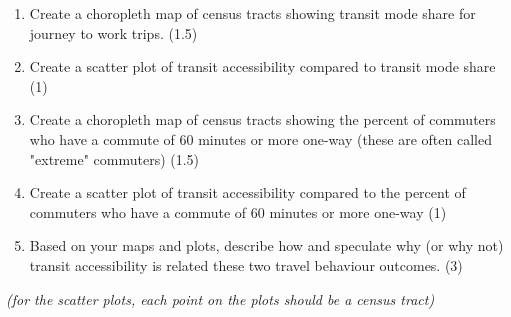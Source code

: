 \documentclass[11pt]{article}
\begin{document}
	\begin{enumerate}
		\item Create a choropleth map of census tracts showing transit mode share for journey to work trips. (1.5)
		
		\item Create a scatter plot of transit accessibility compared to transit mode share (1)
		
		\item Create a choropleth map of census tracts showing the percent of commuters who have a commute of 60 minutes or more one-way (these are often called "extreme" commuters) (1.5)
		
		\item Create a scatter plot of transit accessibility compared to the percent of commuters who have a commute of 60 minutes or more one-way (1)
		
		\item Based on your maps and plots, describe how and speculate why (or why not) transit accessibility is related these two travel behaviour outcomes. (3)
		
	\end{enumerate}
		
	\textit{(for the scatter plots, each point on the plots should be a census tract)}
	
	
\end{document}
